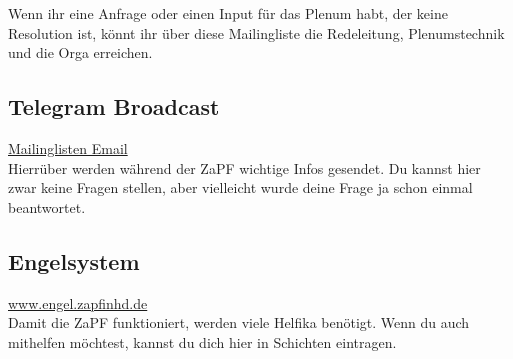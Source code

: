 \noindent Wenn ihr eine Anfrage oder einen Input für das Plenum habt, der keine Resolution ist, könnt ihr über diese Mailingliste die Redeleitung, Plenumstechnik und die Orga erreichen.

\subsection{Telegram Broadcast}
\url{Mailinglisten Email} \\

\noindent Hierrüber werden während der ZaPF wichtige Infos gesendet. Du kannst hier zwar keine Fragen stellen, aber vielleicht wurde deine Frage ja schon einmal beantwortet.

\subsection{Engelsystem}
\url{www.engel.zapfinhd.de}\\

\noindent Damit die ZaPF funktioniert, werden viele Helfika benötigt. Wenn du auch mithelfen möchtest, kannst du dich hier in Schichten eintragen.
